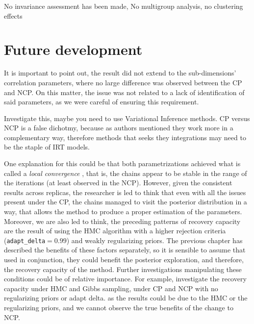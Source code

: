 No invariance assessment has been made, No multigroup analysis, no clustering effects

\section{Future development}

It is important to point out, the result did not extend to the sub-dimensions' correlation parameters, where no large difference was observed between the CP and NCP. On this matter, the issue was not related to a lack of identification of said parameters, as we were careful of ensuring this requirement.

Investigate this, maybe you need to use Variational Inference methods. CP versus NCP is a false dichotmy, because as authors mentioned they work more in a complementary way, therefore methods that seeks they integrations may need to be the staple of IRT models.

One explanation for this could be that both parametrizations achieved what is called a \textit{local convergence} \cite{Depaoli_2021}, that is, the chains appear to be stable in the range of the iterations (at least observed in the NCP). However, given the consistent results across replicas, the researcher is led to think that even with all the issues present under the CP, the chains managed to visit the posterior distribution in a way, that allows the method to produce a proper estimation of the parameters. Moreover, we are also led to think, the preceding patterns of recovery capacity are the result of using the HMC algorithm with a higher rejection criteria (\texttt{adapt\_delta}$=0.99$) and weakly regularizing priors. The previous chapter has described the benefits of these factors separately, so it is sensible to assume that used in conjunction, they could benefit the posterior exploration, and therefore, the recovery capacity of the method. Further investigations manipulating these conditions could be of relative importance. For example, investigate the recovery capacity under HMC and Gibbs sampling, under CP and NCP with no regularizing priors or adapt delta. as the results could be due to the HMC or the regularizing priors, and we cannot observe the true benefits of the change to NCP.